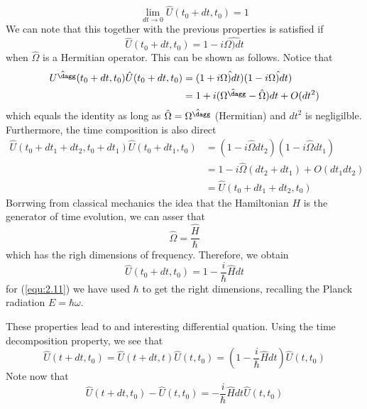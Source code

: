 \begin{itemize}
\begin{equation}
      \qquad \lim_{dt \to 0} \hat{U}(t_0+dt,t_0) = 1
      \label{equ:2.9}
    \end{equation}
    We can note that this together with the previous
    properties is satisfied if
    \begin{equation}
      \hat{U}(t_0+dt,t_0) = 1- i\hat{\Omega)dt}
      \label{equ:2.10}
    \end{equation}
    when $\hat{\Omega}$ is a Hermitian operator.
    This can be shown as follows. Notice that
    \begin{align*}
      \hat{U^\dagg} (t_0+dt,t_0) \hat{U}(t_0+dt,t_0) &= 
      (1+ i\hat{\Omega)dt})(1- i\hat{\Omega)dt})\\
      &=
      1+i(\hat{\Omega^\dagg}-\hat{\Omega})dt + O(dt^2)
    \end{align*}
    which equals the identity as long as $\hat{\Omega} =
    \hat{\Omega^\dagg}$ (Hermitian) and $dt^2$ is
    negligilble. Furthermore, the time composition is also
    direct
    \begin{align*}
      \hat{U}(t_0+dt_1+dt_2,t_0+dt_1)\hat{U}(t_0+dt_1,t_0)
      &= (1-i\hat{\Omega}dt_2)(1-i\hat{\Omega}dt_1) \\
      &= 1-i\hat{\Omega}(dt_2+dt_1) + O(dt_1dt_2)\\
      &= \hat{U}(t_0+dt_1+dt_2,t_0)
    \end{align*}
    Borrwing from classical mechanics the idea that the
    Hamiltonian $H$ is the generator of time evolution, we
    can asser that
    \begin{equation}
      \hat{\Omega} = \frac{\hat{H}}{\hbar}
      \label{equ:2.11}
    \end{equation}
    which has the righ dimensions of frequency. Therefore,
    we obtain
    \begin{equation}
      \hat{U}(t_0+dt,t_0) = 1 -\frac{i}{\hbar}\hat{H}dt
      \label{equ:2.12}
    \end{equation}
    for (\ref{equ:2.11}) we have used $\hbar$ to get the
    right dimensions, recalling the Planck radiation $E =
    \hbar \omega$.
\end{itemize}
These properties lead to and interesting differential
quation. Using the time decomposition property, we see that
\begin{equation}
  \hat{U}(t+dt,t_0) = \hat{U}(t+dt,t) \hat{U}(t,t_0) =
  (1-\frac{i}{\hbar}\hat{H}dt)\hat{U}(t,t_0)
  \label{equ:2.13}
\end{equation}
Note now that
\begin{equation}
  \hat{U}(t+dt,t_0)-\hat{U}(t,t_0) = - \frac{i}{\hbar}
  \hat{H}dt \hat{U}(t,t_0)
  \label{equ:2.14}
\end{equation}
